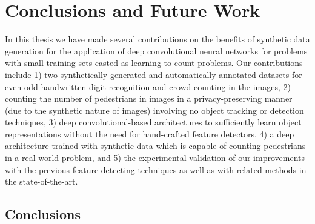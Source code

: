 \newpage

\chapter{Conclusions and Future Work}
\label{sec:conclusions}

\noindent In this thesis we have made several contributions on the benefits of synthetic data generation for the application of deep convolutional neural networks for problems with small training sets casted as learning to count problems. Our contributions include 1) two synthetically generated and automatically annotated datasets for even-odd handwritten digit recognition and crowd counting in the images, 2) counting the number of pedestrians in images in a privacy-preserving manner (due to the synthetic nature of images) involving no object tracking or detection techniques, 3) deep convolutional-based architectures to sufficiently learn object representations without the need for hand-crafted feature detectors, 4) a deep architecture trained with synthetic data which is capable of counting pedestrians in a real-world problem, and 5) the experimental validation of our improvements with the previous feature detecting techniques as well as with related methods in the state-of-the-art. 


\section{Conclusions}

